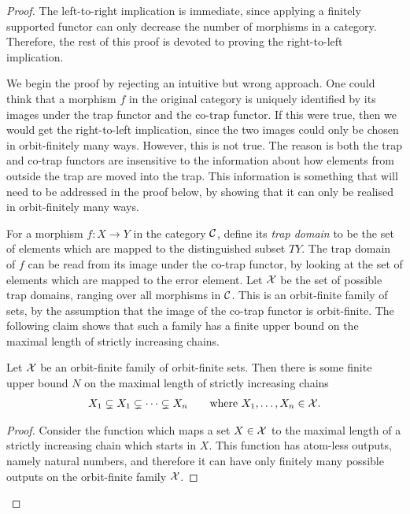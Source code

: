 \begin{proof}
    The left-to-right implication is immediate, since applying a finitely supported functor can only decrease the number of morphisms in a category. Therefore, the rest of this proof is devoted to proving the right-to-left implication.

    We begin the proof by rejecting an intuitive but wrong approach. One could think that a morphism $f$ in the original category is uniquely identified by its images under the trap functor and the co-trap functor. If this were true, then we would get the right-to-left implication, since the two images could only be chosen in orbit-finitely many ways. However, this is not true. The reason is both the trap and co-trap functors are insensitive to the information about how elements from outside the trap are moved into the trap. This information is something that will need to be addressed in the proof below, by showing that it can only be realised in orbit-finitely many ways.

    For a morphism $f : X \to Y$ in the category ${\mathcal C}$, define its \emph{trap domain} to be the set of elements which are mapped to the distinguished subset $TY$. The trap domain of $f$ can be read from its image under the co-trap functor, by looking at the set of elements which are mapped to the error element.   Let $\mathcal X$ be the set of possible trap domains, ranging over all morphisms in ${\mathcal C}$. This is an orbit-finite family of sets, by the assumption that the image of the co-trap functor is orbit-finite. The following claim shows that such a family has a finite upper bound on the maximal length of strictly increasing chains.


            \begin{claim}\label{claim:chains-bounded}
            Let $\mathcal X$ be an orbit-finite family of orbit-finite sets. Then there is some finite upper bound $N$ on the maximal length of strictly increasing chains
            \begin{align*}
            X_1 \subsetneq X_1 \subsetneq \cdots \subsetneq X_n 
            \qquad 
            \text{where $X_1,\ldots,X_n \in \mathcal X$.}
            \end{align*}
        \end{claim}
        \begin{proof}
            Consider the function which maps a set $X \in \mathcal X$ to the maximal length of a strictly increasing chain which starts in $X$. This function has atom-less outputs, namely natural numbers, and therefore it can have only finitely many possible outputs on the orbit-finite family $\mathcal X$. 
        \end{proof}


\end{proof}
